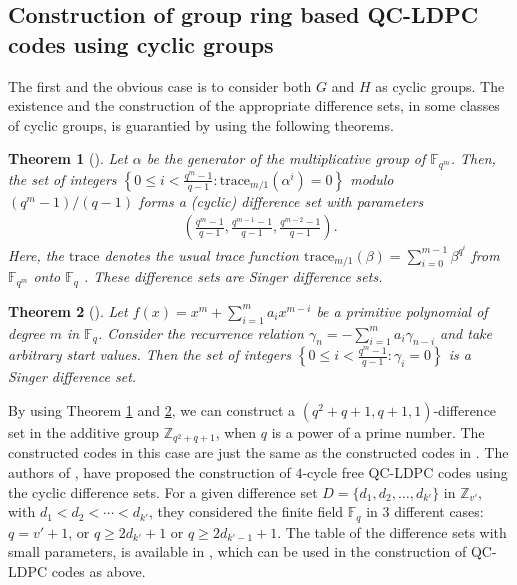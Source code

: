\documentclass[journal,draftclsnofoot,onecolumn,12pt,twoside]{IEEEtran}
\newtheorem{theorem}{Theorem}
\begin{document}
\subsection{Construction of group ring based QC-LDPC codes using cyclic groups}\label{Cyclic groups}
The first and the obvious case is to consider both $G$ and $H$ as cyclic groups. The existence and the construction of the appropriate difference sets, in some classes of cyclic groups, is  guarantied by using the following theorems.
\begin{theorem}[\emph{\cite[Construction 18.28]{17}}]\label{theorem4}
Let $\alpha$  be the generator of the multiplicative group of $\mathbb{F}_{q^m}$. Then, the set of integers $\left\lbrace 0 \leq i <\frac {q^m -1}{q-1}: \mathrm{trace}_{m/1}(\alpha^i) = 0\right\rbrace$ modulo $(q^m-1)/(q-1)$ forms a (cyclic) difference set with parameters
\begin{eqnarray}\label{eqsin}
\left(\frac{q^m-1}{q-1},\frac{q^{m-1}-1}{q-1},\frac{q^{m-2}-1}{q-1}\right).
\end{eqnarray}
Here, the $\mathrm{trace}$ denotes the usual trace function $\mathrm{trace}_{m/1}(\beta) =\sum_{i=0}^{m-1}\beta^{q^i}$  from $\mathbb{F}_{q^m}$ onto $\mathbb{F}_q$ . These difference sets are \emph{Singer difference sets}.
\end{theorem}

\begin{theorem}[\emph{\cite[Construction 18.29]{17}}]\label{theorem5}
Let $f(x)=x^m+\sum_{i=1}^{m}a_i x^{m-i}$ be a primitive polynomial of degree $m$ in $\mathbb{F}_q$. Consider the recurrence relation $\gamma_n=-\sum_{i=1}^{m}a_i \gamma_{n-i}$ and take arbitrary start values. Then the set of integers $\left\lbrace 0 \leq i < \frac{q^m-1}{q-1} : \gamma_i = 0\right\rbrace$ is a Singer difference set.
\end{theorem}

By using Theorem \ref{theorem4} and \ref{theorem5}, we can construct a $(q^2 +q+1, q+1, 1)$-difference
set in the additive group $\mathbb{Z}_{q^2+q+1}$, when $q$ is a power of a prime number.  The constructed codes in this case are just the same as the constructed codes in \cite{15}. The authors of \cite{15}, have proposed the construction of $4$-cycle free QC-LDPC codes using the cyclic difference sets. For a given difference set $D=\{d_1,d_2,\ldots,d_{k'}\}$ in $\mathbb{Z}_{v'}$, with $ d_1<d_2<\cdots <d_{k'}$,  they considered the finite field  $\mathbb{F}_q$ in $3$ different cases: $q=v'+1$, or $q\geq 2d_{k'}+1$ or $q\geq 2d_{k'-1}+1$. The table of the difference sets with small parameters, is available in \cite[pp. 427--430]{17}, which can  be used in the construction of QC-LDPC codes as above.
\end{document}
